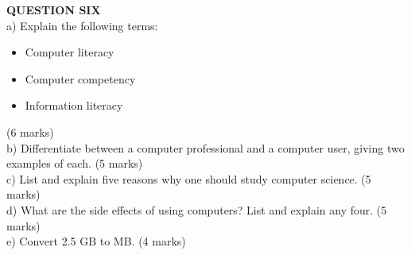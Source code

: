 \documentclass[12pt]{article}
\begin{document}
\vspace{0.5cm}

\noindent
\textbf{QUESTION SIX}\\
a) Explain the following terms:
    \begin{itemize}
        \item Computer literacy
        \item Computer competency
        \item Information literacy
    \end{itemize}
    \hfill (6 marks)\\
b) Differentiate between a computer professional and a computer user, giving two examples of each. \hfill (5 marks)\\
c) List and explain five reasons why one should study computer science. \hfill (5 marks)\\
d) What are the side effects of using computers? List and explain any four. \hfill (5 marks)\\
e) Convert 2.5 GB to MB. \hfill (4 marks)\\
\end{document}
